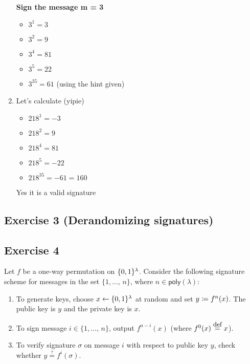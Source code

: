 \begin{solution}
\begin{enumerate}
		\textbf{Sign the message m = 3}
		\begin{itemize}
			\item $3^{1} = 3 $
			\item $3^{2} = 9 $
			\item $3^{4} = 81 $
			\item $3^{5} = 22 $
			\item $3^{35} = 61 $ (using the hint given)
		\end{itemize}
		\item
		Let's calculate (yipie)
		\begin{itemize}
			\item $218^{1} = -3 $
			\item $218^{2} = 9 $
			\item $218^{4} = 81 $
			\item $218^{5} = -22 $
			\item $218^{35} = -61 = 160$
		\end{itemize}
		Yes it is a valid signature
	\end{enumerate}
\end{solution}



\subsection{Exercise 3 (Derandomizing signatures)}




\subsection{Exercise 4}

Let $f$ be a one-way permutation on $\{0, 1\}^\lambda$.
Consider the following signature scheme for messages in the set
$\{1,\dots,\,n\}$, where $n\in\mathsf{poly}(\lambda)$: \vspace{3mm}

\begin{enumerate}
	\item To generate keys, choose $x\leftarrow \{0, 1\}^\lambda$ at random
	and set $y \coloneqq f^n(x)$. The public key is $y$ and the private key is $x$.
	\item To sign message $i\in\{1,\dots,\,n\}$, output $f^{n-i}(x)$
	(where $f^0(x)\stackrel{\mbox{\small def}}{=}x$).
	\item To verify signature $\sigma$ on message $i$ with respect to
	public key $y$, check whether $y\stackrel{?}{=}f^i(\sigma)$.
\end{enumerate}

